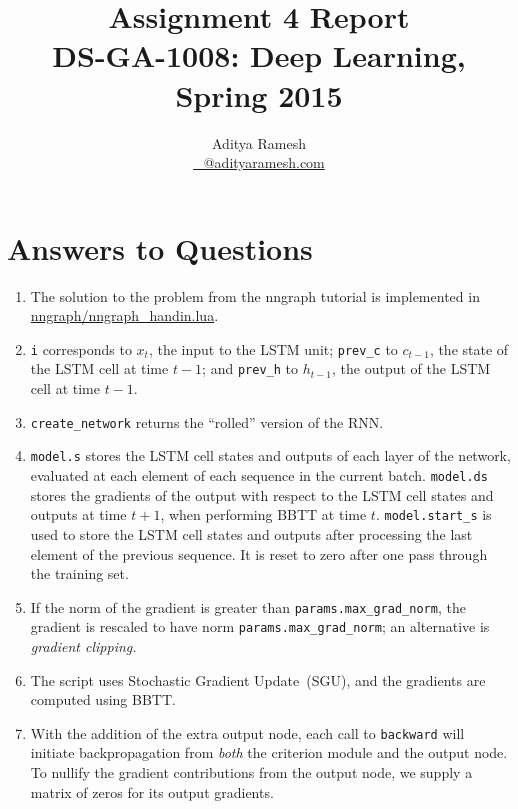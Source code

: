 \documentclass[11pt,a4paper]{article}
\title{Assignment 4 Report \\ DS-GA-1008: Deep Learning, Spring 2015}
\author{Aditya Ramesh \\ \url{_@adityaramesh.com}}
\begin{document}
\maketitle

\section{Answers to Questions}

\begin{enumerate}
\item The solution to the problem from the \textsf{nngraph} tutorial is
implemented in \url{nngraph/nngraph_handin.lua}.

\item \lstinline{i} corresponds to $x_t$, the input to the LSTM unit;
\lstinline{prev_c} to $c_{t - 1}$, the state of the LSTM cell at time $t - 1$;
and \lstinline{prev_h} to $h_{t - 1}$, the output of the LSTM cell at time $t -
1$.

\item \lstinline{create_network} returns the ``rolled'' version of the RNN.

\item \lstinline{model.s} stores the LSTM cell states and outputs of each layer
of the network, evaluated at each element of each sequence in the current batch.
\lstinline{model.ds} stores the gradients of the output with respect to the LSTM
cell states and outputs at time $t + 1$, when performing BBTT at time $t$.
\lstinline{model.start_s} is used to store the LSTM cell states and outputs
after processing the last element of the previous sequence. It is reset to zero
after one pass through the training set.

\item If the norm of the gradient is greater than
\lstinline{params.max_grad_norm}, the gradient is rescaled to have norm
\lstinline{params.max_grad_norm}; an alternative is \emph{gradient clipping.}

\item The script uses Stochastic Gradient Update~(SGU), and the gradients are
computed using BBTT.

\item With the addition of the extra output node, each call to
\lstinline{backward} will initiate backpropagation from \emph{both} the
criterion module and the output node. To nullify the gradient contributions from
the output node, we supply a matrix of zeros for its output gradients.
\end{enumerate}
\end{document}
